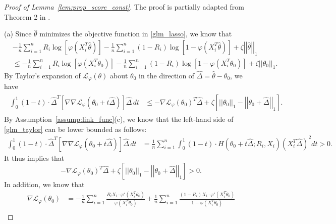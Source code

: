 \documentclass[ejsv2,noshowframe]{imsart}
\theoremstyle{plain}
\theoremstyle{definition}
\theoremstyle{remark}
\newcommand{\norm}[1]{\left|\left| #1 \right|\right|}
\renewcommand{\hat}{\widehat}
\begin{document}
\begin{proof}[Proof of Lemma~\ref{lem:prop_score_const}]
	The proof is partially adapted from Theorem 2 in \cite{cai2023statistical}.
	
	\noindent (a) Since $\hat{\theta}$ minimizes the objective function in \eqref{glm_lasso}, we know that
	\begin{align*}
		&-\frac{1}{n} \sum_{i=1}^n R_i \log\left[\varphi(X_i^T\hat{\theta})\right] -\frac{1}{n}\sum_{i=1}^n (1-R_i)\log\left[1-\varphi(X_i^T \hat{\theta}) \right]  + \zeta\norm{\hat{\theta}}_1\\ 
		&\leq -\frac{1}{n} \sum_{i=1}^n R_i \log\left[\varphi(X_i^T\theta_0)\right] -\frac{1}{n}\sum_{i=1}^n (1-R_i)\log\left[1-\varphi(X_i^T \theta_0) \right]  + \zeta\norm{\theta_0}_1.
	\end{align*}
	By Taylor's expansion of $\mathcal{L}_{\varphi}(\theta)$ about $\theta_0$ in the direction of $\hat{\Delta}=\hat{\theta} -\theta_0$, we have
	\begin{align}
		\label{glm_taylor}
		\begin{split}
			\int_0^1 (1-t)\cdot \hat{\Delta}^T \left[\nabla\nabla \mathcal{L}_{\varphi}(\theta_0+t\hat{\Delta})\right] \hat{\Delta} \,dt 
			& \leq -\nabla\mathcal{L}_{\varphi}(\theta_0)^T \hat{\Delta} + \zeta \left[\norm{\theta_0}_1 - \norm{\theta_0 + \hat{\Delta}}_1\right].
		\end{split}
	\end{align}
	By Assumption~\ref{assump:link_func}(c), we know that the left-hand side of \eqref{glm_taylor} can be lower bounded as follows:
	\begin{align*}
		\int_0^1 (1-t)\cdot \hat{\Delta}^T \left[\nabla\nabla \mathcal{L}_{\varphi}(\theta_0+t\hat{\Delta})\right] \hat{\Delta} \,dt
		&=\frac{1}{n} \sum_{i=1}^n \int_0^1 (1-t) \cdot H(\theta_0+t\hat{\Delta};R_i,X_i) \left(X_i^T\hat{\Delta}\right)^2 dt >0.
	\end{align*}
	It thus implies that
	\begin{equation}
		\label{glm_taylor2}
		-\nabla\mathcal{L}_{\varphi}(\theta_0)^T \hat{\Delta} + \zeta \left[\norm{\theta_0}_1 - \norm{\theta_0 + \hat{\Delta}}_1\right] >0.
	\end{equation}
	In addition, we know that
	\begin{align*}
		\nabla\mathcal{L}_{\varphi}(\theta_0) &= -\frac{1}{n}\sum_{i=1}^n \frac{R_iX_i \cdot \varphi'(X_i^T \theta_0)}{\varphi(X_i^T\theta_0)} +\frac{1}{n} \sum_{i=1}^n \frac{(1-R_i)X_i \cdot \varphi'(X_i^T\theta_0)}{1-\varphi(X_i^T\theta_0)}\\

\end{align*}
\end{proof}
\end{document}

